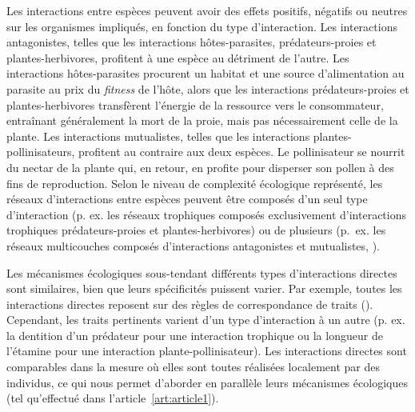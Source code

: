 Les interactions entre espèces peuvent avoir des effets positifs, négatifs ou
neutres sur les organismes impliqués, en fonction du type d'interaction. Les
interactions antagonistes, telles que les interactions hôtes-parasites,
prédateurs-proies et plantes-herbivores, profitent à une espèce au détriment de
l'autre. Les interactions hôtes-parasites procurent un habitat et une source
d'alimentation au parasite au prix du \textit{fitness} de l'hôte, alors que les
interactions prédateurs-proies et plantes-herbivores transfèrent l'énergie de la
ressource vers le consommateur, entraînant généralement la mort de la proie,
mais pas nécessairement celle de la plante. Les interactions mutualistes, telles
que les interactions plantes-pollinisateurs, profitent au contraire aux deux
espèces. Le pollinisateur se nourrit du nectar de la plante qui, en retour, en
profite pour disperser son pollen à des fins de reproduction. Selon le niveau de
complexité écologique représenté, les réseaux d'interactions entre espèces
peuvent être composés d'un seul type d'interaction (p. ex. les réseaux
trophiques composés exclusivement d'interactions trophiques prédateurs-proies et
plantes-herbivores) ou de plusieurs (p.~ex. les réseaux multicouches composés
d'interactions antagonistes et mutualistes, \cite{Pilosof2017Multilayer}). 
 
Les mécanismes écologiques sous-tendant différents types d'interactions directes
sont similaires, bien que leurs spécificités puissent varier. Par exemple,
toutes les interactions directes reposent sur des règles de correspondance de
traits (\cite{Poisot2015Species}). Cependant, les traits pertinents varient d'un
type d'interaction à un autre (p. ex. la dentition d'un prédateur pour une
interaction trophique ou la longueur de l'étamine pour une interaction
plante-pollinisateur). Les interactions directes sont comparables dans la mesure
où elles sont toutes réalisées localement par des individus, ce qui nous permet
d'aborder en parallèle leurs mécanismes écologiques (tel qu'effectué dans
l'article~\ref{art:article1}).

